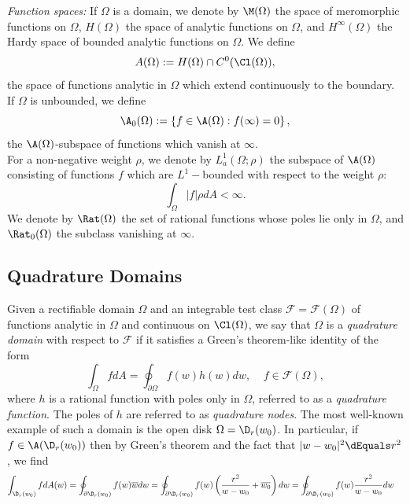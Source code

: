 \documentclass{article}
\numberwithin{equation}{section}
\begin{document}
{\it Function spaces:} If $\Omega$ is a domain, we denote by $\M(\Omega)$ the space of meromorphic functions on $\Omega$, $H(\Omega)$ the space of analytic functions on $\Omega$, and $H^\infty(\Omega)$ the Hardy space of bounded analytic functions on $\Omega$. We define
$$A(\Omega):=H(\Omega)\cap C^0(\Cl(\Omega)),$$
the space of functions analytic in $\Omega$ which extend continuously to the boundary.\\
If $\Omega$ is unbounded, we define
$$\A_0(\Omega):=\left\{f\in\A(\Omega):f(\infty)=0\right\},$$
the $\A(\Omega)$-subspace of functions which vanish at $\infty$.\\
For a non-negative weight $\rho$, we denote by $L_a^1(\Omega;\rho)$ the subspace of $\A(\Omega)$ consisting of functions $f$ which are $L^1-$bounded with respect to the weight $\rho$:
$$\int_{\Omega}|f|\rho dA<\infty.$$
We denote by $\Rat(\Omega)$ the set of rational functions whose poles lie only in $\Omega$, and $\Rat_0(\Omega)$ the subclass vanishing at $\infty$.















\subsection{Quadrature Domains}\label{subsec:QDs}

Given a rectifiable domain $\Omega$ and an integrable test class $\mathcal{F}=\mathcal{F}(\Omega)$ of functions analytic in $\Omega$ and continuous on $\Cl(\Omega)$, we say that $\Omega$ is a \emph{quadrature domain} with respect to $\mathcal{F}$ if it satisfies a Green's theorem-like identity of the form
\begin{equation}\label{eqn:ClassicContourQID}
\int_{\Omega}fdA=\oint_{\partial\Omega}f(w)h(w)dw,\;\;\;\;f\in\mathcal{F}(\Omega),
\end{equation}
where $h$ is a rational function with poles only in $\Omega$, referred to as a \emph{quadrature function}. The poles of $h$ are referred to as \emph{quadrature nodes}. The most well-known example of such a domain is the open disk $\Omega=\D_r(w_0)$. In particular, if $f\in\A(\D_r(w_0))$ then by Green's theorem and the fact that $|w-w_0|^2\dEquals r^2$, we find
\begin{align*}
\int_{\D_r(w_0)}fdA(w)&=\oint_{\partial\D_r(w_0)}f(w)\overline{w}dw=\oint_{\partial\D_r(w_0)}f(w)\left(\dfrac{r^2}{w-w_0}+\overline{w_0}\right)dw=\oint_{\partial\D_r(w_0)}f(w)\dfrac{r^2}{w-w_0}dw
\end{align*}
\end{document}
